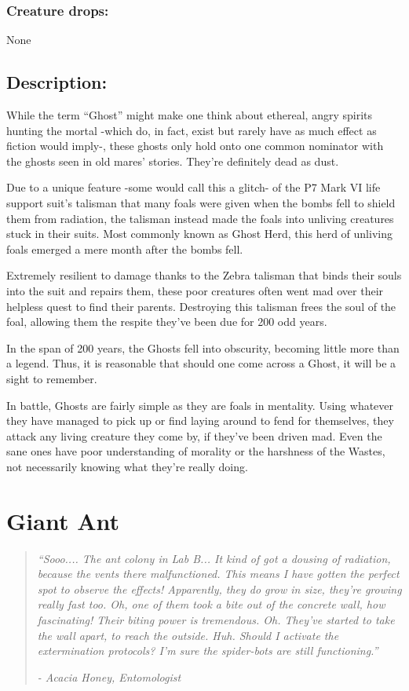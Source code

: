 \documentclass[11pt,a4paper,twocolumn]{book}
\begin{document}
	\subsubsection*{Creature drops:}
	None
	
	\subsection*{Description:}
	While the term ``Ghost'' might make one think about ethereal, angry spirits hunting the mortal -which do, in fact, exist but rarely have as much effect as fiction would imply-, these ghosts only hold onto one common nominator with the ghosts seen in old mares' stories. They're definitely dead as dust. 
	
	Due to a unique feature -some would call this a glitch- of the P7 Mark VI life support suit's talisman that many foals were given when the bombs fell to shield them from radiation, the talisman instead made the foals into unliving creatures stuck in their suits. Most commonly known as Ghost Herd, this herd of unliving foals emerged a mere month after the bombs fell.
	
	\bigskip
	Extremely resilient to damage thanks to the Zebra talisman that binds their souls into the suit and repairs them, these poor creatures often went mad over their helpless quest to find their parents. Destroying this talisman frees the soul of the foal, allowing them the respite they've been due for 200 odd years.
	
	In the span of 200 years, the Ghosts fell into obscurity, becoming little more than a legend. Thus, it is reasonable that should one come across a Ghost, it will be a sight to remember.
	
	In battle, Ghosts are fairly simple as they are foals in mentality. Using whatever they have managed to pick up or find laying around to fend for themselves, they attack any living creature they come by, if they've been driven mad. Even the sane ones have poor understanding of morality or the harshness of the Wastes, not necessarily knowing what they're really doing.
	
	\clearpage
	
	\section*{Giant Ant}
	\begin{quote}
		\emph{``Sooo.... The ant colony in Lab B... It kind of got a dousing of radiation, because the vents there malfunctioned. This means I have gotten the perfect spot to observe the effects! Apparently, they do grow in size, they're growing really fast too. Oh, one of them took a bite out of the concrete wall, how fascinating! Their biting power is tremendous. Oh. They've started to take the wall apart, to reach the outside. Huh. Should I activate the extermination protocols? I'm sure the spider-bots are still functioning.''}
		
		\emph{-	Acacia Honey, Entomologist}
	\end{quote}
	
\end{document}
